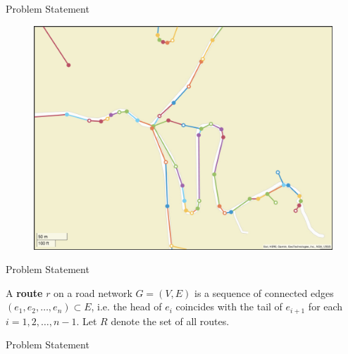 \documentclass[aspectratio=169, bigfiles]{beamer}
\begin{document}
\begin{frame}{Problem Statement}
\begin{figure}
    \centering
    \includegraphics[scale=.405]{roadnetwork9.png}
\end{figure}

\end{frame}


\begin{frame}{Problem Statement}
\begin{definition}[Route]
A \textbf{route} $r$ on a road network $G=(V,E)$ is a sequence of connected edges $(e_1,e_2,\dots,e_n)\subset E$, i.e. 
the head of $e_i$ coincides with the tail of $e_{i+1}$ for each $i = 1, 2, \dots, n-1$.
Let $R$ denote the set of all routes.
\end{definition}
\end{frame}

\begin{frame}{Problem Statement}
\begin{center}
     \end{center}
\end{frame}
\end{document}
